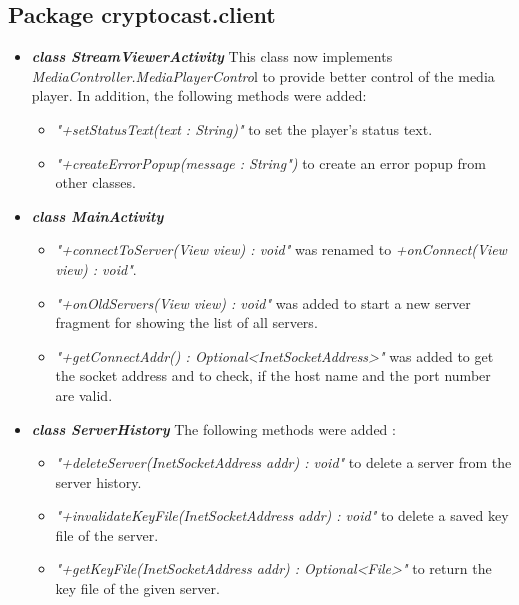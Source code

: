 \documentclass[a4paper,10pt]{scrartcl}
\begin{document}
\subsection{Package cryptocast.client}


\begin{itemize}

\item \textbf{\textit{class StreamViewerActivity}} \newline
   This class now implements  \textit{MediaController.MediaPlayerContro}l to provide better 
	control of the media player. In addition, the following methods were added:
	\begin{itemize}
	 \item \textit{"+setStatusText(text : String)"} to set the player's status text.
	 \item \textit{"+createErrorPopup(message : String")} to create an error popup from other classes.
	\end{itemize}
	
	 \item \textbf{\textit{class MainActivity}}
	\begin{itemize}
	 \item \textit{"+connectToServer(View view) : void"} was renamed to \textit{+onConnect(View view) : void"}.
	 \item \textit{"+onOldServers(View view) : void"} was added to start a new server fragment for showing the 
	  list of all servers.
		\item \textit{"+getConnectAddr() : Optional<InetSocketAddress>"} was added to get the socket address 
		and to check, if the host name and the port number are valid.
	\end{itemize}
	
	\item \textbf{\textit{class ServerHistory}} \newline
	The following methods were added :
	\begin{itemize}
   \item \textit{"+deleteServer(InetSocketAddress addr) : void"} to delete a server from the server history.
	 \item \textit{"+invalidateKeyFile(InetSocketAddress addr) : void"} to delete a saved key file of the server.
	 \item \textit{"+getKeyFile(InetSocketAddress addr) : Optional<File>"} to return the key file of the given server.
	\end{itemize}


\end{itemize}
\end{document}
